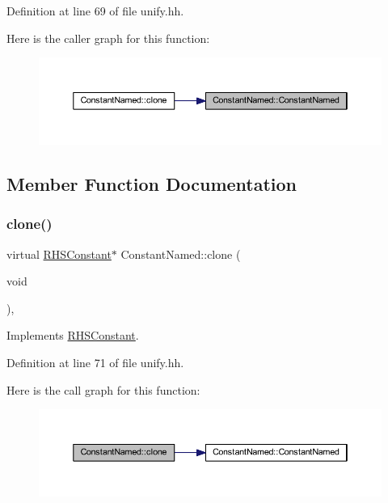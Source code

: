 Definition at line 69 of file unify.\+hh.

Here is the caller graph for this function\+:
\nopagebreak
\begin{figure}[H]
\begin{center}
\leavevmode
\includegraphics[width=350pt]{class_constant_named_a2fcb49b791d7e1e877cfc3d914fdab02_icgraph}
\end{center}
\end{figure}


\subsection{Member Function Documentation}
\mbox{\label{class_constant_named_af2013741889b5f76eb87f77651783e28}} 
\subsubsection{\texorpdfstring{clone()}{clone()}}
{\footnotesize\ttfamily virtual \mbox{\hyperlink{class_r_h_s_constant}{R\+H\+S\+Constant}}$\ast$ Constant\+Named\+::clone (\begin{DoxyParamCaption}\item[{void}]{ }\end{DoxyParamCaption})\hspace{0.3cm}{\ttfamily [inline]}, {\ttfamily [virtual]}}



Implements \mbox{\hyperlink{class_r_h_s_constant_a3e43335a89351a453932a8c0544d5722}{R\+H\+S\+Constant}}.



Definition at line 71 of file unify.\+hh.

Here is the call graph for this function\+:
\nopagebreak
\begin{figure}[H]
\begin{center}
\leavevmode
\includegraphics[width=350pt]{class_constant_named_af2013741889b5f76eb87f77651783e28_cgraph}
\end{center}
\end{figure}
\mbox{\label{class_constant_named_a714b8dea21d1d728beb39909a7e40324}} 
